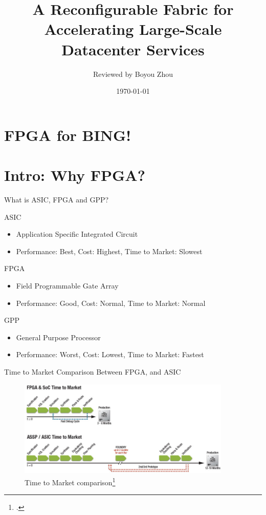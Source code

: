 \documentclass[t]{beamer}
\title[FPGA for BING!]{A Reconfigurable Fabric for Accelerating Large-Scale Datacenter Services}
\author[bobzhou@bu.edu]{Reviewed by Boyou Zhou}
\date[\today]{\today}
\begin{document}
\maketitle

\section*{FPGA for BING!}

\section{Intro: Why FPGA?}

\begin{frame}{What is ASIC, FPGA and GPP?}
    \begin{block}{ASIC}
        \begin{itemize}
            \item Application Specific Integrated Circuit
            \item Performance: Best, Cost: Highest, Time to Market: Slowest
        \end{itemize}
    \end{block}
    \begin{block}{FPGA}
        \begin{itemize}
            \item Field Programmable Gate Array
            \item Performance: Good, Cost: Normal, Time to Market: Normal 
        \end{itemize}
    \end{block}
    \begin{block}{GPP}
       \begin{itemize}
            \item General Purpose Processor
            \item Performance: Worst, Cost: Lowest, Time to Market: Fastest
       \end{itemize} 
    \end{block}
\end{frame}

\begin{frame}{Time to Market Comparison Between FPGA, and ASIC}
    \begin{figure}
        \includegraphics[width=4in]{img/design-time-comparison.png}
        \caption{Time to Market comparison\footcite{http://www.rtcmagazine.com/articles/view/102721}}
        \label{fig:time-to-market}
    \end{figure}
\end{frame}
\end{document}
